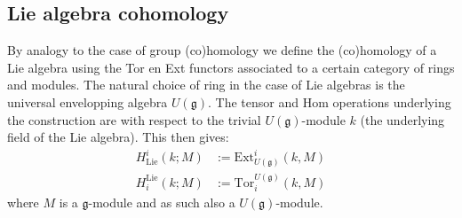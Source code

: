 \subsection{Lie algebra cohomology}


    By analogy to the case of group (co)homology we define the (co)homology of a Lie algebra using the Tor en Ext functors associated to a certain category of rings and modules. The natural choice of ring in the case of Lie algebras is the universal envelopping algebra $U(\mathfrak{g})$. The tensor and Hom operations underlying the construction are with respect to the trivial $U(\mathfrak{g})$-module $k$ (the underlying field of the Lie algebra). This then gives:
    \begin{align}
        H^i_{\text{Lie}}(k;M) &:= \text{Ext}^i_{U(\mathfrak{g})}(k,M)\\
        H_i^{\text{Lie}}(k;M) &:= \text{Tor}_i^{U(\mathfrak{g})}(k,M)
    \end{align}
    where $M$ is a $\mathfrak{g}$-module and as such also a $U(\mathfrak{g})$-module.


